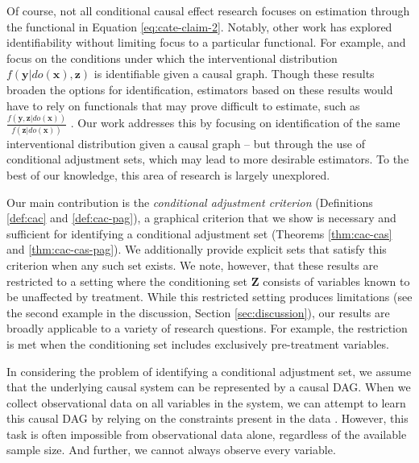 \documentclass[twoside]{article}
\newcommand{\mb}[1]{\mathbf{#1}}
\begin{document}

Of course, not all conditional causal effect research focuses on estimation through the functional in Equation \eqref{eq:cate-claim-2}. Notably, other work has explored identifiability without limiting focus to a particular functional. For example, \cite{shpitser2008complete} and \cite{jaber2019identification, jaber2022causal} focus on the conditions under which the interventional distribution $f(\mb{y}|do(\mb{x}),\mb{z})$ is identifiable given a causal graph. Though these results broaden the options for identification, estimators based on these results would have to rely on functionals that may prove difficult to estimate, such as $\frac{f(\mb{y},\mb{z}|do(\mb{x}))}{f(\mb{z}|do(\mb{x}))}$ \citep{shpitser2008complete, jaber2019identification, jaber2022causal}. Our work addresses this by focusing on identification of the same interventional distribution given a causal graph -- but through the use of conditional adjustment sets, which may lead to more desirable estimators. To the best of our knowledge, this area of research is largely unexplored.

Our main contribution is the \textit{conditional adjustment criterion} (Definitions \ref{def:cac} and \ref{def:cac-pag}), a graphical criterion that we show is necessary and sufficient for identifying a conditional adjustment set (Theorems \ref{thm:cac-cas} and \ref{thm:cac-cas-pag}). We additionally provide explicit sets that satisfy this criterion when any such set exists. We note, however, that these results are restricted to a setting where the conditioning set $\mb{Z}$ consists of variables known to be unaffected by treatment. While this restricted setting produces limitations (see the second example in the discussion, Section \ref{sec:discussion}), our results are broadly applicable to a variety of research questions. For example, the restriction is met when the conditioning set includes exclusively pre-treatment variables.


In considering the problem of identifying a conditional adjustment set, we assume that the underlying causal system can be represented by a causal DAG. When we collect observational data on all variables in the system, we can attempt to learn this causal DAG by relying on the constraints present in the data \citep{spirtes1999algorithm, chickering2002learning, zhang2008completeness, hauser2012characterization, mooij2020joint, squires2022causal}. However, this task is often impossible from observational data alone, regardless of the available sample size. And further, we cannot always observe every variable. 
\end{document}
